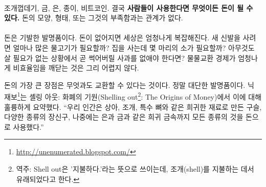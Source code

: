 
\paragraph{}
조개껍데기, 금, 은, 종이, 비트코인. 결국 \textbf{사람들이 사용한다면 무엇이든 돈이 될 수 있다.}
돈의 모양, 형태, 또는 그것의 부족함과는 관계가 없다.


\paragraph{}
돈은 기발한 발명품이다.
돈이 없어지면 세상은 엄청나게 복잡해진다.
새 신발을 사려면 얼마나 많은 물고기가 필요할까? 
집을 사는데 몇 마리의 소가 필요할까? 
아무것도 살 필요가 없는 상황에서 곧 썩어버릴 사과를 없애야 한다면? 
물물교환 경제가 엄청나게 비효율임을 깨닫는 것은 그리 어렵지 않다.



돈의 가장 큰 장점은 무엇과도 교환할 수 있다는 것이다. 정말 대단한 발명품이다. 
닉 재보\footnote{\url{http://unenumerated.blogspot.com/}}는 
셸링 아웃: 화폐의 기원(Shelling out\footnote{역주: Shell out은 '지불하다.'라는 뜻으로 쓰이는데, 조개(shell)를 지불하는 데서 유래되었다고 한다.}: The Origins of Money)\cite{shelling-out}에서 
이에 대해 훌륭하게 요약했다.
\enquote{우리 인간은 상아, 조개, 특수 뼈와 같은 희귀한 재료로 만든 구슬, 다양한 종류의 장신구, 
	나중에는 은과 금과 같은 희귀 금속까지 모든 종류의 것을 돈으로 사용했다.}




